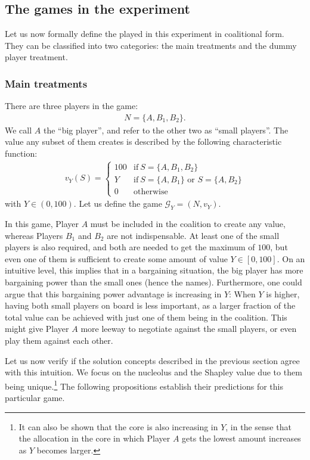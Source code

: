 \documentclass[12pt]{article}
\begin{document}
\subsection{The games in the experiment}

Let us now formally define the played in this experiment in coalitional form. They can be classified into two categories: the main treatments and the dummy player treatment. 

\subsubsection{Main treatments} \label{explanation_main_treatments}

There are three players in the game:
\begin{align*}
    N = \{A, B_1, B_2\}.
\end{align*}
We call $A$ the ``big player'', and refer to the other two as ``small players''. The value any subset of them creates is described by the following characteristic function:
\begin{align*}
    v_Y(S) = \begin{cases}
        100 & \text{if}\ S = \{A, B_1, B_2\} \\
        Y & \text{if}\ S = \{A, B_1\} \text{ or } S = \{A, B_2\} \\
        0 & \text{otherwise}
    \end{cases}
\end{align*}
with $Y \in (0, 100)$. Let us define the game $\mathcal{G}_Y = (N, v_Y)$.

In this game, Player $A$ must be included in the coalition to create any value, whereas Players $B_1$ and $B_2$ are not indispensable. At least one of the small players is also required, and both are needed to get the maximum of $100$, but even one of them is sufficient to create some amount of value $Y \in [0, 100]$. On an intuitive level, this implies that in a bargaining situation, the big player has more bargaining power than the small ones (hence the names). Furthermore, one could argue that this bargaining power advantage is increasing in $Y$: When $Y$ is higher, having both small players on board is less important, as a larger fraction of the total value can be achieved with just one of them being in the coalition. This might give Player $A$ more leeway to negotiate against the small players, or even play them against each other.

Let us now verify if the solution concepts described in the previous section agree with this intuition. We focus on the nucleolus and the Shapley value due to them being unique.\footnote{It can also be shown that the core is also increasing in $Y$, in the sense that the allocation in the core in which Player $A$ gets the lowest amount increases as $Y$ becomes larger.} The following propositions establish their predictions for this particular game.
\end{document}

